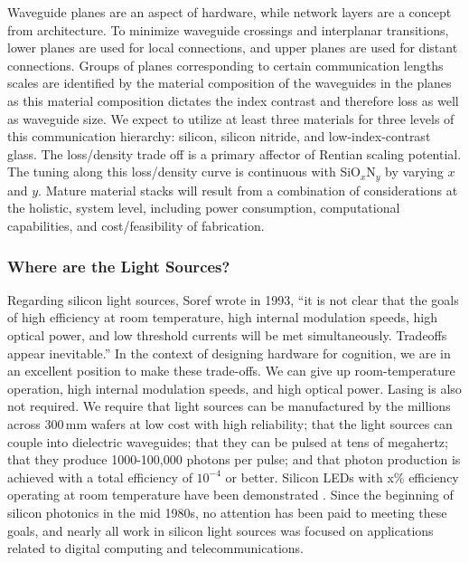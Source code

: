 \vspace{3em}
Waveguide planes are an aspect of hardware, while network layers are a concept from architecture. To minimize waveguide crossings and interplanar transitions, lower planes are used for local connections, and upper planes are used for distant connections. Groups of planes corresponding to certain communication lengths scales are identified by the material composition of the waveguides in the planes as this material composition dictates the index contrast and therefore loss as well as waveguide size. We expect to utilize at least three materials for three levels of this communication hierarchy: silicon, silicon nitride, and low-index-contrast glass. The loss/density trade off is a primary affector of Rentian scaling potential. The tuning along this loss/density curve is continuous with SiO$_x$N$_y$ by varying $x$ and $y$. Mature material stacks will result from a combination of considerations at the holistic, system level, including power consumption, computational capabilities, and cost/feasibility of fabrication.

\subsubsection{Where are the Light Sources?}
Regarding silicon light sources, Soref wrote in 1993, ``it is not clear that the goals of high efficiency at room temperature, high internal modulation speeds, high optical power, and low threshold currents will be met simultaneously. Tradeoffs appear inevitable.'' In the context of designing hardware for cognition, we are in an excellent position to make these trade-offs. We can give up room-temperature operation, high internal modulation speeds, and high optical power. Lasing is also not required. We require that light sources can be manufactured by the millions across 300\,mm wafers at low cost with high reliability; that the light sources can couple into dielectric waveguides; that they can be pulsed at tens of megahertz; that they produce 1000-100,000 photons per pulse; and that photon production is achieved with a total efficiency of $10^{-4}$ or better. Silicon LEDs with x\% efficiency operating at room temperature have been demonstrated \cite{}. Since the beginning of silicon photonics in the mid 1980s, no attention has been paid to meeting these goals, and nearly all work in silicon light sources was focused on applications related to digital computing and telecommunications. 




